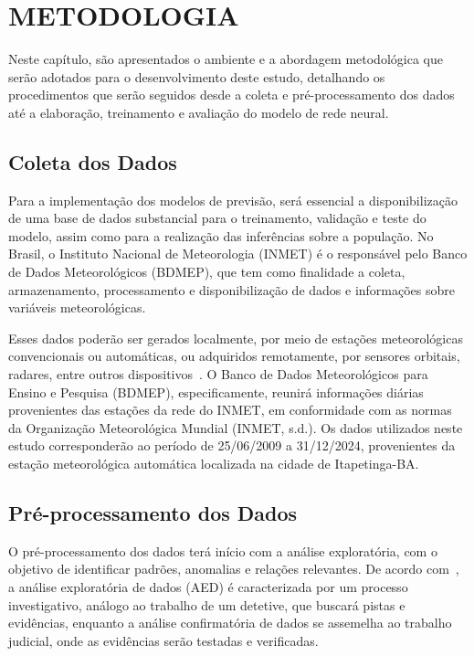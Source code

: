 \chapter{METODOLOGIA} %

    Neste capítulo, são apresentados o ambiente e a abordagem metodológica que serão adotados para o 
    desenvolvimento deste estudo, detalhando os procedimentos que serão seguidos desde a coleta e 
    pré-processamento dos dados até a elaboração, treinamento e avaliação do modelo de rede neural.

\section{Coleta dos Dados}

    Para a implementação dos modelos de previsão, será essencial a disponibilização de uma base de dados 
    substancial para o treinamento, validação e teste do modelo, assim como para a realização das inferências 
    sobre a população. No Brasil, o Instituto Nacional de Meteorologia (INMET) é o responsável pelo Banco de 
    Dados Meteorológicos (BDMEP), que tem como finalidade a coleta, armazenamento, processamento e 
    disponibilização de dados e informações sobre variáveis meteorológicas.

    Esses dados poderão ser gerados localmente, por meio de estações meteorológicas convencionais ou 
    automáticas, ou adquiridos remotamente, por sensores orbitais, radares, entre outros 
    dispositivos~\cite{vianna2017}. O Banco de Dados Meteorológicos para Ensino e Pesquisa (BDMEP), 
    especificamente, reunirá informações diárias provenientes das estações da rede do INMET, em 
    conformidade com as normas da Organização Meteorológica Mundial (INMET, s.d.). Os dados utilizados 
    neste estudo corresponderão ao período de 25/06/2009 a 31/12/2024, provenientes da estação meteorológica 
    automática localizada na cidade de Itapetinga-BA.

\section{Pré-processamento dos Dados}

    O pré-processamento dos dados terá início com a análise exploratória, com o objetivo de identificar 
    padrões, anomalias e relações relevantes. De acordo com~, a análise exploratória 
    de dados (AED) é caracterizada por um processo investigativo, análogo ao trabalho de um detetive, 
    que buscará pistas e evidências, enquanto a análise confirmatória de dados se assemelha ao trabalho 
    judicial, onde as evidências serão testadas e verificadas.


